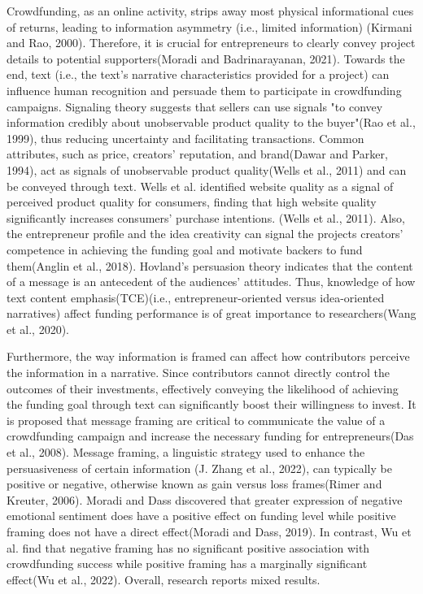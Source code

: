 \documentclass[a4paper]{article}
\begin{document}
Crowdfunding, as an online activity, strips away most physical informational cues of returns, leading to information asymmetry (i.e., limited information) (Kirmani and Rao, 2000). Therefore, it is crucial for entrepreneurs to clearly convey project details to potential supporters(Moradi and Badrinarayanan, 2021). Towards the end, text (i.e., the text’s narrative characteristics provided for a project) can influence human recognition and persuade them to participate in crowdfunding campaigns. Signaling theory suggests that sellers can use signals "to convey information credibly about unobservable product quality to the buyer"(Rao et al., 1999), thus reducing uncertainty and facilitating transactions. Common attributes, such as price, creators’ reputation, and brand(Dawar and Parker, 1994), act as signals of unobservable product quality(Wells et al., 2011) and can be conveyed through text. Wells et al. identified website quality as a signal of perceived product quality for consumers, finding that high website quality significantly increases consumers' purchase intentions. (Wells et al., 2011). Also, the entrepreneur profile and the idea creativity can signal the projects creators’ competence in achieving the funding goal and motivate backers to fund them(Anglin et al., 2018). Hovland’s persuasion theory indicates that the content of a message is an antecedent of the audiences’ attitudes. Thus, knowledge of how text content emphasis(TCE)(i.e., entrepreneur-oriented versus idea-oriented narratives) affect funding performance is of great importance to researchers(Wang et al., 2020). 

Furthermore, the way information is framed can affect how contributors perceive the information in a narrative. Since contributors cannot directly control the outcomes of their investments, effectively conveying the likelihood of achieving the funding goal through text can significantly boost their willingness to invest. It is proposed that message framing  are critical to communicate the value of a crowdfunding campaign and increase the necessary funding for entrepreneurs(Das et al., 2008). Message framing, a linguistic strategy used to enhance the persuasiveness of certain information (J. Zhang et al., 2022), can typically be positive or negative, otherwise known as gain versus loss frames(Rimer and Kreuter, 2006). Moradi and Dass discovered that greater expression of negative emotional sentiment  does have a positive effect on funding level while positive framing does not have a direct effect(Moradi and Dass, 2019). In contrast, Wu et al. find that negative framing has no significant positive association with crowdfunding success while positive framing has a marginally significant effect(Wu et al., 2022). Overall, research reports mixed results.
\end{document}
